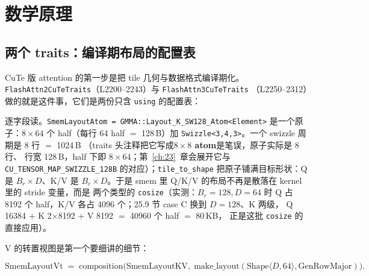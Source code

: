 \section{数学原理}

\subsection{两个 traits：编译期布局的配置表}

CuTe 版 attention 的第一步是把 tile 几何与数据格式编译期化。
\texttt{Flash\allowbreak{}Attn2\allowbreak{}Cu\allowbreak{}Te\allowbreak{}Traits}（L2200--2243）与 \texttt{Flash\allowbreak{}Attn3\allowbreak{}Cu\allowbreak{}Te\allowbreak{}Traits}
（L2250--2312）做的就是这件事，它们是两份只含 \texttt{using} 的配置表：



逐字段读。\texttt{Smem\allowbreak{}Layout\allowbreak{}Atom =\allowbreak{} GMMA::\allowbreak{}Layout\_\allowbreak{}K\_\allowbreak{}SW128\_\allowbreak{}Atom\allowbreak{}<Element>}
是一个原子：$8\times64$ 个 half（每行 64 half $=$ 128\,B）加
\texttt{Swizzle\allowbreak{}<3,\allowbreak{}4,\allowbreak{}3>}。一个 swizzle 周期是 8 行 $=$ 1024\,B
（traits 头注释把它写成\textbf{$8\times8$ atom}是笔误，原子实际是 8 行、
行宽 128\,B，half 下即 $8\times64$；第~\ref{ch:23}~章会展开它与
\texttt{CU\_\allowbreak{}TENSOR\_\allowbreak{}MAP\_\allowbreak{}SWIZZLE\_\allowbreak{}128B} 的对应）；\texttt{tile\_\allowbreak{}to\_\allowbreak{}shape}
把原子铺满目标形状：Q 是 $B_r\times D$、K/V 是 $B_c\times D$。于是
smem 里 Q/K/V 的布局不再是散落在 kernel 里的 stride 变量，而是
两个类型的 \texttt{cosize}（实测：$B_r{=}128,D{=}64$ 时 Q 占 8192 个
half，K/V 各占 4096 个；25.9 节 case C 换到 $D{=}128$、K 两级，
Q 16384 $+$ K 2$\times$8192 $+$ V 8192 $=$ 40960 个 half $=$ 80\,KB，
正是这批 \texttt{cosize} 的直接应用）。

V 的转置视图是第一个要细讲的细节：

\begin{equation}
  \mathrm{SmemLayoutVt} \;=\; \mathrm{composition}\bigl(\mathrm{SmemLayoutKV},\;
  \mathrm{make\_layout}(\mathrm{Shape}\langle D, 64\rangle, \mathrm{GenRowMajor})\bigr).
  \label{eq:25-vt}
\end{equation}

